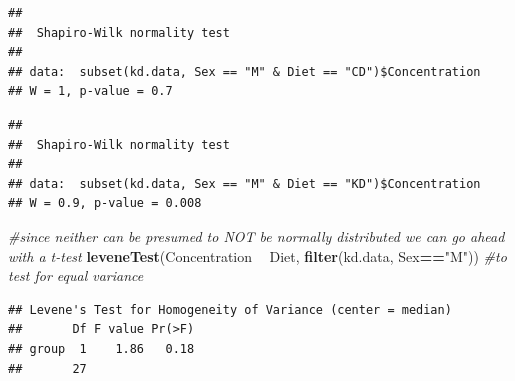 \documentclass[]{article}
\newenvironment{Shaded}{\begin{snugshade}}{\end{snugshade}}
\newcommand{\CommentTok}[1]{\textcolor[rgb]{0.56,0.35,0.01}{\textit{#1}}}
\newcommand{\DataTypeTok}[1]{\textcolor[rgb]{0.13,0.29,0.53}{#1}}
\newcommand{\KeywordTok}[1]{\textcolor[rgb]{0.13,0.29,0.53}{\textbf{#1}}}
\newcommand{\NormalTok}[1]{#1}
\newcommand{\OperatorTok}[1]{\textcolor[rgb]{0.81,0.36,0.00}{\textbf{#1}}}
\newcommand{\StringTok}[1]{\textcolor[rgb]{0.31,0.60,0.02}{#1}}
\begin{document}
\begin{verbatim}
## 
##  Shapiro-Wilk normality test
## 
## data:  subset(kd.data, Sex == "M" & Diet == "CD")$Concentration
## W = 1, p-value = 0.7
\end{verbatim}

\begin{Shaded}
\end{Shaded}

\begin{verbatim}
## 
##  Shapiro-Wilk normality test
## 
## data:  subset(kd.data, Sex == "M" & Diet == "KD")$Concentration
## W = 0.9, p-value = 0.008
\end{verbatim}

\begin{Shaded}
\begin{Highlighting}[]
\CommentTok{#since neither can be presumed to NOT be normally distributed we can go ahead with a t-test}
\KeywordTok{leveneTest}\NormalTok{(Concentration }\OperatorTok{~}\StringTok{ }\NormalTok{Diet, }\KeywordTok{filter}\NormalTok{(kd.data, Sex}\OperatorTok{==}\StringTok{"M"}\NormalTok{)) }\CommentTok{#to test for equal variance}
\end{Highlighting}
\end{Shaded}

\begin{verbatim}
## Levene's Test for Homogeneity of Variance (center = median)
##       Df F value Pr(>F)
## group  1    1.86   0.18
##       27
\end{verbatim}

\begin{Shaded}
\end{Shaded}
\end{document}
